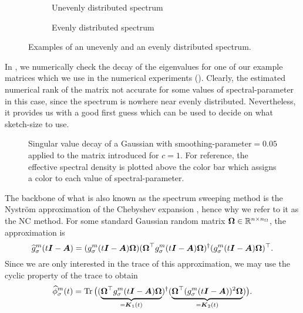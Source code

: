 \begin{figure}[ht]
    \centering
    \begin{subfigure}[t]{0.45\columnwidth}
        
        \caption{Unevenly distributed spectrum}
    \end{subfigure}
    \begin{subfigure}[t]{0.45\columnwidth}
        
        \caption{Evenly distributed spectrum}
    \end{subfigure}      
    \caption{Examples of an unevenly and an evenly distributed spectrum.}
    \label{fig:3-nystrom-evenly-distributed-spectrum}
\end{figure}

In , we numerically check the decay
of the eigenvalues for one of our example matrices which we use in the numerical
experiments (). Clearly, the estimated
numerical rank of the matrix not accurate for some values of \gls{spectral-parameter}
in this case, since the spectrum is
nowhere near evenly distributed. Nevertheless, it provides us with a good first
guess which can be used to decide on what \gls{sketch-size} to use.\\
\begin{figure}[ht]
    \centering
    
    \caption{Singular value decay of a Gaussian 
       with \gls{smoothing-parameter}$=0.05$ applied to the matrix introduced
        for $c=1$. For reference,
       the effective spectral density is plotted above the color bar which
       assigns a color to each value of \gls{spectral-parameter}.}
    \label{fig:3-nystrom-singular-value-decay}
\end{figure}

The backbone of what is also known as the spectrum sweeping method \cite{lin2017randomized}
is the Nystr\"om approximation of the Chebyshev expansion ,
hence why we refer to it as the \gls{NC} method. 
For some standard Gaussian random matrix $\boldsymbol{\Omega} \in \mathbb{R}^{n \times n_{\Omega}}$,
the approximation is
\begin{equation}
    \widehat{g}_{\sigma}^m(t\boldsymbol{I} - \boldsymbol{A})
    = (g_{\sigma}^m(t\boldsymbol{I} - \boldsymbol{A}) \boldsymbol{\Omega}) (\boldsymbol{\Omega}^{\top} g_{\sigma}^m(t\boldsymbol{I} - \boldsymbol{A}) \boldsymbol{\Omega})^{\dagger} (g_{\sigma}^m(t\boldsymbol{I} - \boldsymbol{A}) \boldsymbol{\Omega})^{\top}.
    \label{equ:3-nystrom-nystrom-smoothing-kernel}
\end{equation}
Since we are only interested in the trace of this approximation,
we may use the cyclic property of the trace to obtain
\begin{equation}
    \widehat{\phi}_{\sigma}^m(t)
        = \operatorname{Tr}\big((\underbrace{\boldsymbol{\Omega}^{\top} g_{\sigma}^m(t\boldsymbol{I} - \boldsymbol{A}) \boldsymbol{\Omega}}_{=\boldsymbol{K}_1(t)})^{\dagger} (\underbrace{\boldsymbol{\Omega}^{\top} (g_{\sigma}^m(t\boldsymbol{I} - \boldsymbol{A}))^2 \boldsymbol{\Omega}}_{=\boldsymbol{K}_2(t)})\big).
    \label{equ:3-nystrom-spectral-density}
\end{equation}\\


